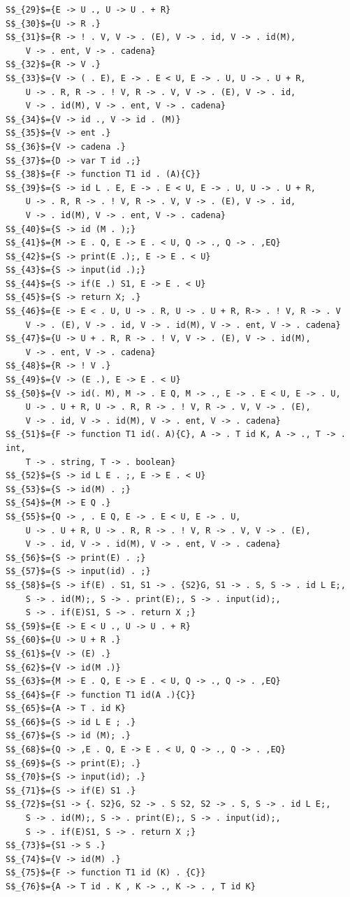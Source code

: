 \begin{lstlisting}[style =EstadosAutomataST]
S$_{29}$={E -> U ., U -> U . + R}
S$_{30}$={U -> R .}
S$_{31}$={R -> ! . V, V -> . (E), V -> . id, V -> . id(M), 
	V -> . ent, V -> . cadena}
S$_{32}$={R -> V .}
S$_{33}$={V -> ( . E), E -> . E < U, E -> . U, U -> . U + R,
	U -> . R, R -> . ! V, R -> . V, V -> . (E), V -> . id,
	V -> . id(M), V -> . ent, V -> . cadena}
S$_{34}$={V -> id ., V -> id . (M)}
S$_{35}$={V -> ent .}
S$_{36}$={V -> cadena .}
S$_{37}$={D -> var T id .;}
S$_{38}$={F -> function T1 id . (A){C}}
S$_{39}$={S -> id L . E, E -> . E < U, E -> . U, U -> . U + R,
	U -> . R, R -> . ! V, R -> . V, V -> . (E), V -> . id,
	V -> . id(M), V -> . ent, V -> . cadena}
S$_{40}$={S -> id (M . );}
S$_{41}$={M -> E . Q, E -> E . < U, Q -> ., Q -> . ,EQ}
S$_{42}$={S -> print(E .);, E -> E . < U}
S$_{43}$={S -> input(id .);}
S$_{44}$={S -> if(E .) S1, E -> E . < U}
S$_{45}$={S -> return X; .}
S$_{46}$={E -> E < . U, U -> . R, U -> . U + R, R-> . ! V, R -> . V
	V -> . (E), V -> . id, V -> . id(M), V -> . ent, V -> . cadena}
S$_{47}$={U -> U + . R, R -> . ! V, V -> . (E), V -> . id(M), 
	V -> . ent, V -> . cadena}
S$_{48}$={R -> ! V .}
S$_{49}$={V -> (E .), E -> E . < U}
S$_{50}$={V -> id(. M), M -> . E Q, M -> ., E -> . E < U, E -> . U, 
	U -> . U + R, U -> . R, R -> . ! V, R -> . V, V -> . (E),
	V -> . id, V -> . id(M), V -> . ent, V -> . cadena}
S$_{51}$={F -> function T1 id(. A){C}, A -> . T id K, A -> ., T -> . int,
	T -> . string, T -> . boolean}
S$_{52}$={S -> id L E . ;, E -> E . < U}
S$_{53}$={S -> id(M) . ;}
S$_{54}$={M -> E Q .}
S$_{55}$={Q -> , . E Q, E -> . E < U, E -> . U, 
	U -> . U + R, U -> . R, R -> . ! V, R -> . V, V -> . (E),
	V -> . id, V -> . id(M), V -> . ent, V -> . cadena}
S$_{56}$={S -> print(E) . ;}
S$_{57}$={S -> input(id) . ;}
S$_{58}$={S -> if(E) . S1, S1 -> . {S2}G, S1 -> . S, S -> . id L E;,
	S -> . id(M);, S -> . print(E);, S -> . input(id);,
	S -> . if(E)S1, S -> . return X ;}
S$_{59}$={E -> E < U ., U -> U . + R}
S$_{60}$={U -> U + R .}
S$_{61}$={V -> (E) .}
S$_{62}$={V -> id(M .)}
S$_{63}$={M -> E . Q, E -> E . < U, Q -> ., Q -> . ,EQ}
S$_{64}$={F -> function T1 id(A .){C}}
S$_{65}$={A -> T . id K}
S$_{66}$={S -> id L E ; .}
S$_{67}$={S -> id (M); .}
S$_{68}$={Q -> ,E . Q, E -> E . < U, Q -> ., Q -> . ,EQ}
S$_{69}$={S -> print(E); .}
S$_{70}$={S -> input(id); .}
S$_{71}$={S -> if(E) S1 .}
S$_{72}$={S1 -> {. S2}G, S2 -> . S S2, S2 -> . S, S -> . id L E;,
	S -> . id(M);, S -> . print(E);, S -> . input(id);,
	S -> . if(E)S1, S -> . return X ;}
S$_{73}$={S1 -> S .}
S$_{74}$={V -> id(M) .}
S$_{75}$={F -> function T1 id (K) . {C}}
S$_{76}$={A -> T id . K , K -> ., K -> . , T id K}

\end{lstlisting}

